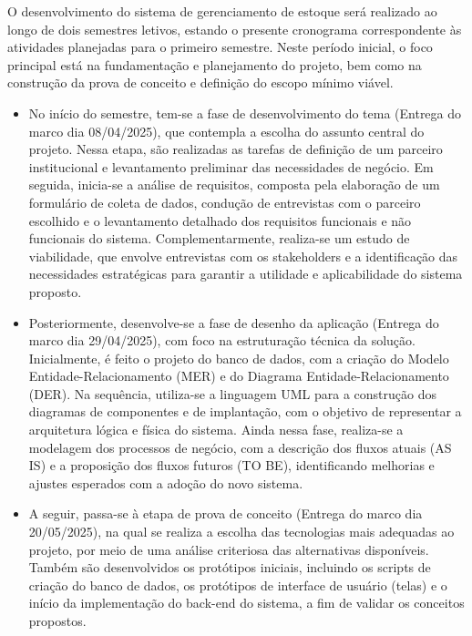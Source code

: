 \documentclass[
	12pt,				%
	openany,			%
	twoside,			%
	a4paper,			%
	english,			%
	brazil				%
	]{abntex2}
\begin{document}
O desenvolvimento do sistema de gerenciamento de estoque será realizado ao longo de dois semestres letivos, estando o presente cronograma correspondente às atividades planejadas para o primeiro semestre. Neste período inicial, o foco principal está na fundamentação e planejamento do projeto, bem como na construção da prova de conceito e definição do escopo mínimo viável.
\begin{itemize}

   \item No início do semestre, tem-se a fase de desenvolvimento do tema (Entrega do marco dia 08/04/2025), que contempla a escolha do assunto central do projeto. Nessa etapa, são realizadas as tarefas de definição de um parceiro institucional e levantamento preliminar das necessidades de negócio. Em seguida, inicia-se a análise de requisitos, composta pela elaboração de um formulário de coleta de dados, condução de entrevistas com o parceiro escolhido e o levantamento detalhado dos requisitos funcionais e não funcionais do sistema. Complementarmente, realiza-se um estudo de viabilidade, que envolve entrevistas com os stakeholders e a identificação das necessidades estratégicas para garantir a utilidade e aplicabilidade do sistema proposto.

  \item Posteriormente, desenvolve-se a fase de desenho da aplicação (Entrega do marco dia 29/04/2025), com foco na estruturação técnica da solução. Inicialmente, é feito o projeto do banco de dados, com a criação do Modelo Entidade-Relacionamento (MER) e do Diagrama Entidade-Relacionamento (DER). Na sequência, utiliza-se a linguagem UML para a construção dos diagramas de componentes e de implantação, com o objetivo de representar a arquitetura lógica e física do sistema. Ainda nessa fase, realiza-se a modelagem dos processos de negócio, com a descrição dos fluxos atuais (AS IS) e a proposição dos fluxos futuros (TO BE), identificando melhorias e ajustes esperados com a adoção do novo sistema.

  \item A seguir, passa-se à etapa de prova de conceito (Entrega do marco dia 20/05/2025), na qual se realiza a escolha das tecnologias mais adequadas ao projeto, por meio de uma análise criteriosa das alternativas disponíveis. Também são desenvolvidos os protótipos iniciais, incluindo os scripts de criação do banco de dados, os protótipos de interface de usuário (telas) e o início da implementação do back-end do sistema, a fim de validar os conceitos propostos.


\end{itemize}
\end{document}
